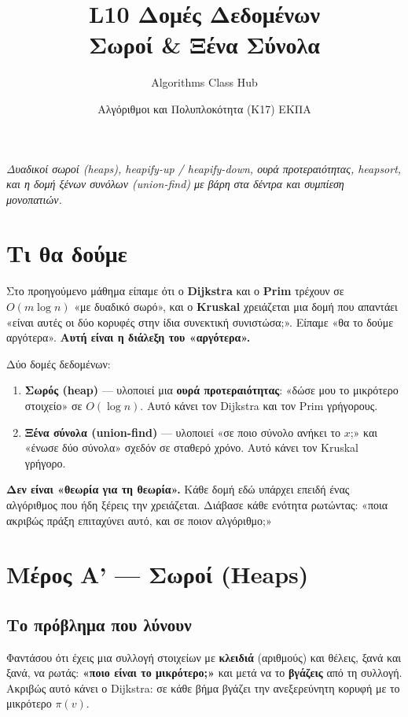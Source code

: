 \documentclass[11pt,a4paper]{article}
\title{\textbf{L10 \textperiodcentered{} Δομές Δεδομένων}\\[2pt]
\large Σωροί \& Ξένα Σύνολα}
\author{Algorithms Class Hub}
\date{\small Αλγόριθμοι και Πολυπλοκότητα (K17) \textperiodcentered{} ΕΚΠΑ}
\begin{document}
\maketitle

\begin{center}\itshape\small
Δυαδικοί σωροί (heaps), heapify-up / heapify-down, ουρά προτεραιότητας,
heapsort, και η δομή ξένων συνόλων (union-find) με βάρη στα δέντρα και συμπίεση
μονοπατιών.
\end{center}

\section{Τι θα δούμε}

Στο προηγούμενο μάθημα είπαμε ότι ο \textbf{Dijkstra} και ο \textbf{Prim} τρέχουν
σε $O(m \log n)$ «με δυαδικό σωρό», και ο \textbf{Kruskal} χρειάζεται μια δομή
που απαντάει «είναι αυτές οι δύο κορυφές στην ίδια συνεκτική συνιστώσα;». Είπαμε
«θα το δούμε αργότερα». \textbf{Αυτή είναι η διάλεξη του «αργότερα».}

Δύο δομές δεδομένων:
\begin{enumerate}
  \item \textbf{Σωρός (heap)} --- υλοποιεί μια \textbf{ουρά προτεραιότητας}:
  «δώσε μου το μικρότερο στοιχείο» σε $O(\log n)$. Αυτό κάνει τον Dijkstra και
  τον Prim γρήγορους.
  \item \textbf{Ξένα σύνολα (union-find)} --- υλοποιεί «σε ποιο σύνολο ανήκει το
  $x$;» και «ένωσε δύο σύνολα» σχεδόν σε σταθερό χρόνο. Αυτό κάνει τον Kruskal
  γρήγορο.
\end{enumerate}

\begin{keypoint}
\textbf{Δεν είναι «θεωρία για τη θεωρία».} Κάθε δομή εδώ υπάρχει επειδή ένας
αλγόριθμος που ήδη ξέρεις την χρειάζεται. Διάβασε κάθε ενότητα ρωτώντας: «ποια
ακριβώς πράξη επιταχύνει αυτό, και σε ποιον αλγόριθμο;»
\end{keypoint}

\section{Μέρος Α' --- Σωροί (Heaps)}

\subsection{Το πρόβλημα που λύνουν}

Φαντάσου ότι έχεις μια συλλογή στοιχείων με \textbf{κλειδιά} (αριθμούς) και
θέλεις, ξανά και ξανά, να ρωτάς: \textbf{«ποιο είναι το μικρότερο;»} και μετά να
το \textbf{βγάζεις} από τη συλλογή. Ακριβώς αυτό κάνει ο Dijkstra: σε κάθε βήμα
βγάζει την ανεξερεύνητη κορυφή με το μικρότερο $\pi(v)$.
\end{document}
